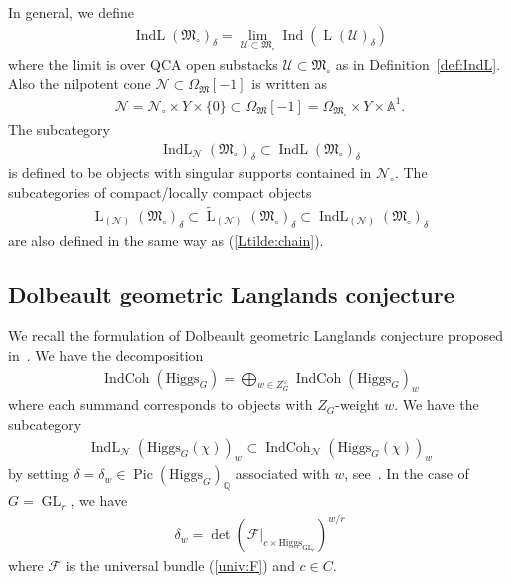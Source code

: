 \documentclass[11pt,oneside,a4paper,mathscr]{amsart}
\theoremstyle{definition}
\newcommand{\LL}{\operatorname{L}}
\newcommand{\Pic}{\operatorname{Pic}}
\newcommand{\cF}{\mathcal{F}}
\newcommand{\Ind}{\operatorname{Ind}}
\newcommand{\IndCoh}{\operatorname{IndCoh}}
\newcommand{\IndL}{\operatorname{IndL}}
\newcommand{\GL}{\operatorname{GL}}
\newcommand{\Hig}{\mathrm{Higgs}}
\begin{document}
In general, we define 
\begin{align*}
    \IndL(\mathfrak{M}_{\circ})_{\delta}=\lim_{\mathcal{U} \subset \mathfrak{M}_{\circ}}\Ind(\LL(\mathcal{U})_{\delta})
\end{align*}
where the limit is over QCA open substacks $\mathcal{U} \subset \mathfrak{M}_{\circ}$ as in 
   Definition~\ref{def:IndL}.
   Also the nilpotent cone $\mathcal{N} \subset \Omega_{\mathfrak{M}}[-1]$ is written as 
   \begin{align*}
       \mathcal{N}=\mathcal{N}_{\circ} \times Y \times \{0\} \subset 
       \Omega_{\mathfrak{M}}[-1]=\Omega_{\mathfrak{M}_{\circ}}\times Y \times \mathbb{A}^1.
   \end{align*}
   The subcategory 
   \begin{align*}
         \IndL_{\mathcal{N}}(\mathfrak{M}_{\circ})_{\delta} \subset 
           \IndL(\mathfrak{M}_{\circ})_{\delta}
   \end{align*}
   is defined to be objects with singular supports contained in $\mathcal{N}_{\circ}$. 
   The subcategories of compact/locally compact objects 
   \begin{align}\label{def:Ltilde:circ}
     \LL_{(\mathcal{N})}(\mathfrak{M}_{\circ})_{\delta} \subset 
     \widetilde{\LL}_{(\mathcal{N})}(\mathfrak{M}_{\circ})_{\delta} \subset 
       \IndL_{(\mathcal{N})}(\mathfrak{M}_{\circ})_{\delta}
   \end{align}
   are also defined in the same way as (\ref{Ltilde:chain}). 



\subsection{Dolbeault geometric Langlands conjecture}\label{subsec:dlconj}
We recall the formulation of Dolbeault geometric Langlands conjecture 
proposed in~\cite{PTlim}. We have the decomposition 
\begin{align*}
    \IndCoh(\Hig_G)=\bigoplus_{w\in Z_G^{\vee}} \IndCoh(\Hig_G)_{w}
\end{align*}
where each summand corresponds to objects with $Z_G$-weight $w$.
We have the subcategory 
\begin{align}\label{indl}
    \IndL_{\mathcal{N}}(\Hig_G(\chi))_w \subset \IndCoh_{\mathcal{N}}(\Hig_G(\chi))_w
\end{align}
by setting $\delta=\delta_w \in \Pic(\Hig_G)_{\mathbb{Q}}$ associated with $w$, see~\cite[Section~7.2]{PTlim}. 
In the case of $G=\GL_r$, we have 
\begin{align}\label{deltaw}
    \delta_w=\det(\cF|_{c\times \Hig_{\GL_r}})^{w/r}
\end{align}
where $\cF$ is the universal bundle (\ref{univ:F}) and $c\in C$. 
\end{document}
